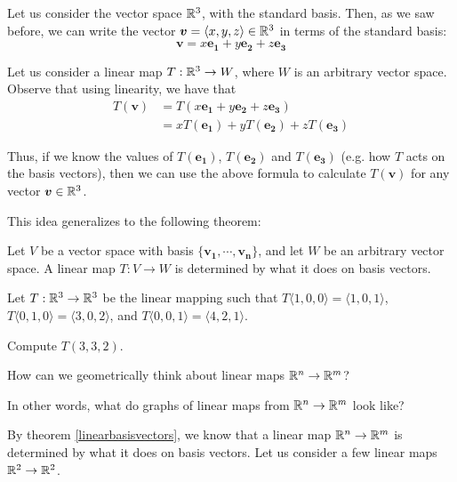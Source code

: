     \begin{example}
    Let us consider the vector space $\mathbb{R}^3$, with the standard basis.  Then, as we saw before, we can write the vector $\bm{v} = \langle x, y,z \rangle \in \mathbb{R}^3$ in terms of the standard basis:
    $$\bm{v} = x\bm{e_1} + y\bm{e_2} + z\bm{e_3}$$
    
    Let us consider a linear map $T : \mathbb{R}^3 \to W$, where $W$ is an arbitrary vector space.  Observe that using linearity, we have that
    \begin{align*}
        T(\bm{v}) &= T(x\bm{e_1} + y\bm{e_2} + z\bm{e_3}) \\
        &= xT(\bm{e_1}) + yT(\bm{e_2}) + zT(\bm{e_3})
    \end{align*}
    
    Thus, if we know the values of $T(\bm{e_1})$, $T(\bm{e_2})$ and $T(\bm{e_3})$ (e.g. how $T$ acts on the basis vectors), then we can use the above formula to calculate $T(\bm{v})$ for any vector $\bm{v} \in \mathbb{R}^3$.  
    
    \end{example}

    This idea generalizes to the following theorem:
    
    \begin{theorem}\label{linearbasisvectors}
    Let $V$ be a vector space with basis $\{\bm{v_1}, \cdots, \bm{v_n}\}$, and let $W$ be an arbitrary vector space.  A linear map $T: V \to W$ is determined by what it does on basis vectors.
    \end{theorem}

    \begin{example}
    Let $T : \mathbb{R}^3 \to \mathbb{R}^3$ be the linear mapping such that $T\langle1,0,0\rangle = \langle1,0,1\rangle$, $T\langle0,1,0\rangle = \langle3,0,2\rangle$, and $T\langle0,0,1\rangle = \langle4,2,1\rangle$. 
    
    Compute $T(3, 3, 2)$.
    \end{example}

\begin{motivating}
How can we geometrically think about linear maps $\mathbb{R}^n \to \mathbb{R}^m$?
\end{motivating}

In other words, what do graphs of linear maps from $\mathbb{R}^n \to \mathbb{R}^m$ look like?

By theorem \ref{linearbasisvectors}, we know that a linear map $\mathbb{R}^n \to \mathbb{R}^m$ is determined by what it does on basis vectors.  Let us consider a few linear maps $\mathbb{R}^2 \to \mathbb{R}^2$.

